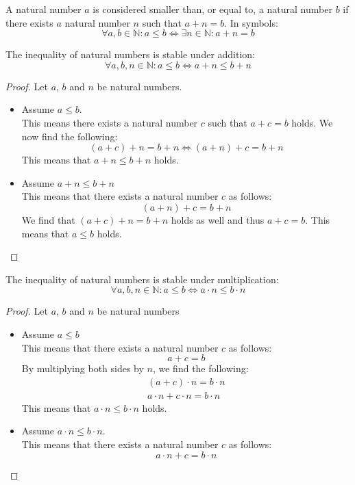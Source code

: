 \documentclass[main.tex]{subfiles}
\begin{document}
\begin{de}
  A natural number $a$ is considered smaller than, or equal to, a natural number $b$ if there exists $a$ natural number $n$ such that $a + n = b$. In symbols:
  \[ \forall a,b \in \mathbb{N}: a \le b \Leftrightarrow \exists n\in\mathbb{N}: a + n = b \]
\end{de}

\begin{pr}
  \label{pr:inequality-of-natural-numers-stable-under-addition}
  The inequality of natural numbers is stable under addition:
  \[ \forall a, b, n \in \mathbb{N}: a \le b \Leftrightarrow a + n \le b + n \]

  \begin{proof}
    Let $a$, $b$ and $n$ be natural numbers.
    \noindent
    \begin{itemize}
      \item \bra
        Assume $a \le b$.\\
        This means there exists a natural number $c$ such that $a+c = b$ holds.
        We now find the following:
        \[ (a + c) + n = b + n \Leftrightarrow (a + n) + c = b + n \]
        This means that $a + n \le b + n$ holds.
      \item \bla
        Assume $a + n \le b + n$\\
        This means that there exists a natural number $c$ as follows:
        \[ (a + n) + c = b + n \]
        We find that $(a + c) + n = b + n$ holds as well and thus $a + c = b$.
        This means that $a \le b$ holds.
    \end{itemize}
  \end{proof}
\end{pr}

\begin{pr}
  The inequality of natural numbers is stable under multiplication:
  \[ \forall a, b, n \in \mathbb{N}: a \le b \Leftrightarrow a \cdot n \le b \cdot n \]

  \begin{proof}
    Let $a$, $b$ and $n$ be natural numbers
    \noindent
    \begin{itemize}
      \item \bra
        Assume $a \le b$\\
        This means that there exists a natural number $c$ as follows:
        \[ a + c = b \]
        By multiplying both sides by $n$, we find the following:
        \begin{align*}
          (a + c) \cdot n = b \cdot n\\
          a\cdot n + c \cdot n = b \cdot n
        \end{align*}
        This means that $a\cdot n \le b \cdot n$ holds.
      \item \bla
        Assume $a \cdot n \le b \cdot n$.\\
        This means that there exists a natural number $c$ as follows:
        \[ a\cdot n + c = b \cdot n \]
    \end{itemize}
  \end{proof}
\end{pr}
\end{document}
